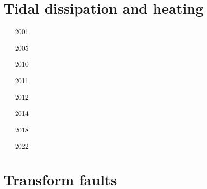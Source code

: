 \section{Tidal dissipation and heating} 

\begin{small}
\begin{itemize}
\item[2001]
\item[2005]
\item[2010]
\item[2011]
\item[2012]
\item[2014] 
\item[2018] 
\item[2022]
\end{itemize}
\end{small}

\section{Transform faults} 

\begin{small}
\begin{itemize}
\item[\nineteenseventytwo] 
\item[\nineteenseventyeight] 
\item[\twothousandseven] 
\item[\twothousandten] 
\item[\twothousandtwelve] 
\item[\twothousandthirteen] 
\item[\twothousandeighteen] 
\item[\twothousandtwenty] 
 \\
\item[\twothousandtwentytwo] 
\end{itemize}
\end{small}

